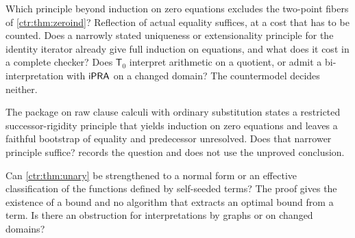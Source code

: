 \begin{question}
Which principle beyond induction on zero equations excludes the two-point fibers of
\cref{ctr:thm:zeroind}? Reflection of actual equality suffices, at a cost that has to be
counted. Does a narrowly stated uniqueness or extensionality principle for the identity
iterator already give full induction on equations, and what does it cost in a complete
checker? Does $\mathsf T_0$ interpret arithmetic on a quotient, or admit a bi-interpretation
with $\mathsf{iPRA}$ on a changed domain? The countermodel decides neither.
\end{question}

\begin{question}
The package on raw clause calculi with ordinary substitution states a restricted
successor-rigidity principle that yields induction on zero equations and leaves a faithful
bootstrap of equality and predecessor unresolved. Does that narrower principle suffice?
 records the question and does not use the unproved conclusion.
\end{question}

\begin{question}
Can \cref{ctr:thm:unary} be strengthened to a normal form or an effective classification of
the functions defined by self-seeded terms? The proof gives the existence of a bound and no
algorithm that extracts an optimal bound from a term. Is there an obstruction for
interpretations by graphs or on changed domains?
\end{question}


